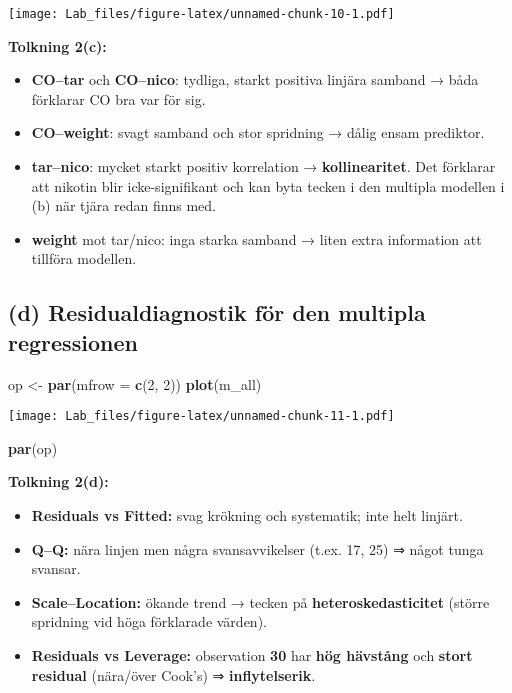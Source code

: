 \documentclass[
  11pt,
]{article}
\newenvironment{Shaded}{\begin{snugshade}}{\end{snugshade}}
\newcommand{\AttributeTok}[1]{\textcolor[rgb]{0.13,0.29,0.53}{#1}}
\newcommand{\DecValTok}[1]{\textcolor[rgb]{0.00,0.00,0.81}{#1}}
\newcommand{\FunctionTok}[1]{\textcolor[rgb]{0.13,0.29,0.53}{\textbf{#1}}}
\newcommand{\NormalTok}[1]{#1}
\newcommand{\OtherTok}[1]{\textcolor[rgb]{0.56,0.35,0.01}{#1}}
\providecommand{\tightlist}{%
  \setlength{\itemsep}{0pt}\setlength{\parskip}{0pt}}
\begin{document}
\texttt{[image: Lab\_files/figure-latex/unnamed-chunk-10-1.pdf]}

\textbf{Tolkning 2(c):}

\begin{itemize}
\tightlist
\item
  \textbf{CO--tar} och \textbf{CO--nico}: tydliga, starkt positiva
  linjära samband → båda förklarar CO bra var för sig.
\item
  \textbf{CO--weight}: svagt samband och stor spridning → dålig ensam
  prediktor.
\item
  \textbf{tar--nico}: mycket starkt positiv korrelation →
  \textbf{kollinearitet}. Det förklarar att nikotin blir
  icke-signifikant och kan byta tecken i den multipla modellen i (b) när
  tjära redan finns med.
\item
  \textbf{weight} mot tar/nico: inga starka samband → liten extra
  information att tillföra modellen.
\end{itemize}

\subsection{(d) Residualdiagnostik för den multipla
regressionen}\label{d-residualdiagnostik-fuxf6r-den-multipla-regressionen}

\begin{Shaded}
\begin{Highlighting}[]
\NormalTok{op }\OtherTok{\textless{}{-}} \FunctionTok{par}\NormalTok{(}\AttributeTok{mfrow =} \FunctionTok{c}\NormalTok{(}\DecValTok{2}\NormalTok{, }\DecValTok{2}\NormalTok{))}
\FunctionTok{plot}\NormalTok{(m\_all)}
\end{Highlighting}
\end{Shaded}

\texttt{[image: Lab\_files/figure-latex/unnamed-chunk-11-1.pdf]}

\begin{Shaded}
\begin{Highlighting}[]
\FunctionTok{par}\NormalTok{(op)}
\end{Highlighting}
\end{Shaded}

\textbf{Tolkning 2(d):}

\begin{itemize}
\tightlist
\item
  \textbf{Residuals vs Fitted:} svag krökning och systematik; inte helt
  linjärt.
\item
  \textbf{Q--Q:} nära linjen men några svansavvikelser (t.ex. 17, 25) ⇒
  något tunga svansar.
\item
  \textbf{Scale--Location:} ökande trend → tecken på
  \textbf{heteroskedasticitet} (större spridning vid höga förklarade
  värden).
\item
  \textbf{Residuals vs Leverage:} observation \textbf{30} har
  \textbf{hög hävstång} och \textbf{stort residual} (nära/över Cook's) ⇒
  \textbf{inflytelserik}.
\end{itemize}
\end{document}
